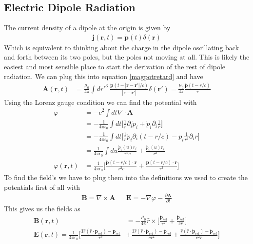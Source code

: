 \subsection{Electric Dipole Radiation}\label{electricdipole}
The current density of a dipole at the origin is given by
\begin{align}
    \textbf{j}(\textbf{r},t) = \dot{\textbf{p}}(t) \delta(\textbf{r})
\end{align}
Which is equivalent to thinking about the charge in the dipole oscillating back and forth between its two poles, but the poles not moving at all. This is likely the easiest and most sensible place to start the derivation of the rest of dipole radiation. We can plug this into equation \ref{magpotretard} and have
\begin{align}
    \textbf{A}(\textbf{r},t) &= \frac{\mu_0}{4\pi}\int dr'^3 ~\frac{\dot{\textbf{p}}(t-|\textbf{r} - \textbf{r}'|/c)}{|\textbf{r}-\textbf{r}'|}\delta(\textbf{r}') = \frac{\mu_0}{4\pi}\frac{\dot{\textbf{p}}(t-r/c)}{r}
\end{align}
Using the Lorenz gauge condition we can find the potential with
\begin{align}
\varphi &= -c^2 \int dt \nabla\cdot\textbf{A} \\
&= -\frac{1}{4\pi\epsilon_0}\int dt \Big[\frac{1}{r}\partial_i \dot{p}_i + \dot{p}_i\partial_i\frac{1}{r}\Big]\\
&= -\frac{1}{4\pi\epsilon_0}\int dt \Big[\frac{1}{r}\ddot{p}_i\partial_i(t-r/c) - \dot{p}_i\frac{1}{r^2}\partial_i r \Big]\\
&= \frac{1}{4\pi\epsilon_0}\int du \frac{\ddot{p}_i(u)r_i}{r^2c} + \frac{\dot{p}_i(u)r_i}{r^3}\\
\varphi(\textbf{r},t) &= \frac{1}{4\pi\epsilon_0}\Big[\frac{\dot{\textbf{p}}(t-r/c)\cdot\textbf{r}}{r^2c} + \frac{\textbf{p}(t-r/c)\cdot\textbf{r}}{r^3}\Big]
\end{align}
To find the field's we have to plug them into the definitions we used to create the potentials first of all with
\begin{align}
    \textbf{B} = \nabla\times\textbf{A} &&\textbf{E} = -\nabla\varphi -\frac{\partial\textbf{A}}{\partial t}
\end{align}
This gives us the fields as
\begin{align}\label{radiationfields}
    \textbf{B}(\textbf{r},t) &= -\frac{\mu_0}{4\pi}\hat{r}\times\Big[\frac{\dot{\textbf{p}}_{ret}}{r^2} + \frac{\ddot{\textbf{p}}_{ret}}{cr}\Big]\\
    \textbf{E}(\textbf{r},t) =\frac{1}{4\pi\epsilon_0}\Big[\frac{3\hat{r}(\hat{r}\cdot\textbf{p}_{ret})-\textbf{p}_{ret}}{r^3}& + \frac{3\hat{r}(\hat{r}\cdot\dot{\textbf{p}}_{ret})-\dot{\textbf{p}}_{ret}}{cr^2} + \frac{\hat{r}(\hat{r}\cdot\ddot{\textbf{p}}_{ret})-\ddot{\textbf{p}}_{ret}}{c^2r}\Big]
\end{align}

